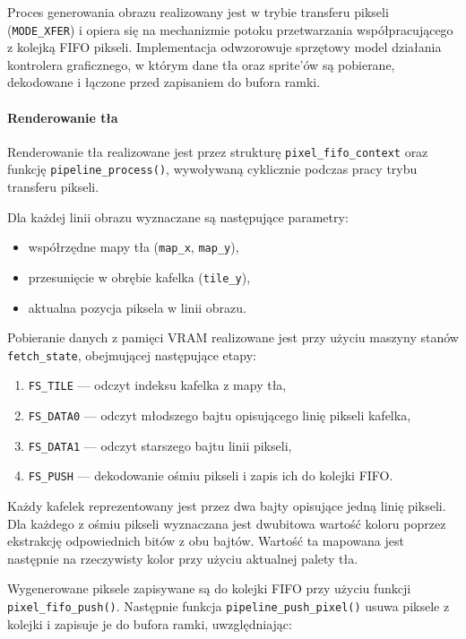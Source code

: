 \documentclass{article}
\begin{document}
Proces generowania obrazu realizowany jest w trybie transferu pikseli (\texttt{MODE\_XFER}) i opiera się na mechanizmie potoku przetwarzania współpracującego z kolejką FIFO pikseli. Implementacja odwzorowuje sprzętowy model działania kontrolera graficznego, w którym dane tła oraz sprite'ów są pobierane, dekodowane i łączone przed zapisaniem do bufora ramki.

\paragraph{Renderowanie tła}

Renderowanie tła realizowane jest przez strukturę \texttt{pixel\_fifo\_context} oraz funkcję \texttt{pipeline\_process()}, wywoływaną cyklicznie podczas pracy trybu transferu pikseli.

Dla każdej linii obrazu wyznaczane są następujące parametry:

\begin{itemize}
	\item współrzędne mapy tła (\texttt{map\_x}, \texttt{map\_y}),
	\item przesunięcie w obrębie kafelka (\texttt{tile\_y}),
	\item aktualna pozycja piksela w linii obrazu.
\end{itemize}

Pobieranie danych z pamięci VRAM realizowane jest przy użyciu maszyny stanów \texttt{fetch\_state}, obejmującej następujące etapy:

\begin{enumerate}
	\item \texttt{FS\_TILE} — odczyt indeksu kafelka z mapy tła,
	\item \texttt{FS\_DATA0} — odczyt młodszego bajtu opisującego linię pikseli kafelka,
	\item \texttt{FS\_DATA1} — odczyt starszego bajtu linii pikseli,
	\item \texttt{FS\_PUSH} — dekodowanie ośmiu pikseli i zapis ich do kolejki FIFO.
\end{enumerate}

Każdy kafelek reprezentowany jest przez dwa bajty opisujące jedną linię pikseli. Dla każdego z ośmiu pikseli wyznaczana jest dwubitowa wartość koloru poprzez ekstrakcję odpowiednich bitów z obu bajtów. Wartość ta mapowana jest następnie na rzeczywisty kolor przy użyciu aktualnej palety tła.

Wygenerowane piksele zapisywane są do kolejki FIFO przy użyciu funkcji \texttt{pixel\_fifo\_push()}. Następnie funkcja \texttt{pipeline\_push\_pixel()} usuwa piksele z kolejki i zapisuje je do bufora ramki, uwzględniając:
\end{document}
